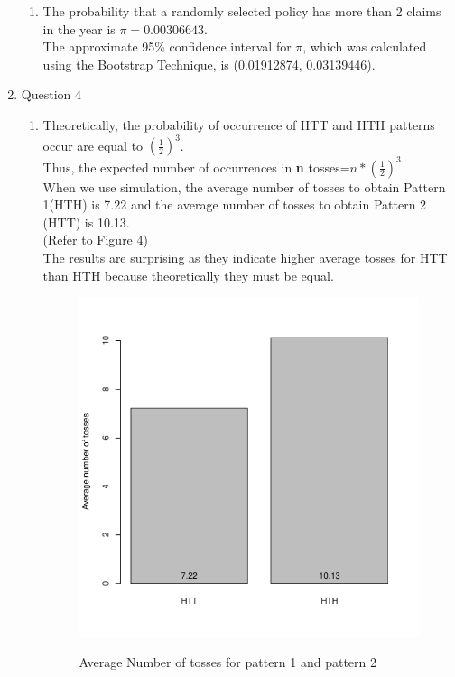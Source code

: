 \documentclass[11pt]{article}
\begin{document}
\begin{enumerate}
\begin{enumerate}
\item The probability that a randomly selected policy has more than 2 claims in the year is $\pi=0.00306643$.\\ The  approximate 95\% confidence interval for $\pi$, which was calculated using the  Bootstrap Technique, is (0.01912874, 0.03139446).\footnotemark 
			 \\
		

\end{enumerate}

\item Question 4
\begin{enumerate}
\item Theoretically, the probability of occurrence of HTT and HTH patterns occur are equal to $(\frac{1}{2})^{3} $.\\
Thus, the expected number of occurrences in \textbf{n} tosses=$n*(\frac{1}{2})^{3}$ \\
When we use simulation, the average number of tosses to obtain Pattern 1(HTH) is 7.22 and the average number of tosses to obtain Pattern 2 (HTT) is 10.13.\\
(Refer to Figure 4)\\
The results are surprising as they indicate higher average tosses for HTT than HTH because theoretically they must be equal.\footnotemark 
			 \\
\begin{figure}[h]
	\caption[Figure4]{Average Number of tosses for pattern 1 and pattern 2}
    \centering
     \includegraphics[scale=0.4]{3qa.pdf}
      \label{fig3}			
\end{figure}\\
 

\end{enumerate}
\end{enumerate}
\end{document}
